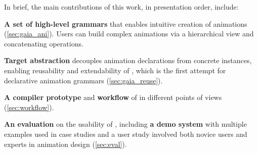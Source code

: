 In brief, the main contributions of this work, in presentation order, include:

\squishlist 
\item \textbf{A set of high-level grammars} that enables intuitive creation of animations (\autoref{sec:gaia_ani}). 
Users can build complex animations via a hierarchical view and concatenating operations. 
\item \textbf{Target abstraction} decouples animation declarations from concrete instances, enabling reusability and extendability of \gaia{}, which is the first attempt for declarative animation grammars (\autoref{sec:gaia_reuse}).
\item \textbf{A compiler prototype} and \textbf{workflow} of \gaia{} in different points of views (\autoref{sec:workflow}).
\item \textbf{An evaluation} on the usability of \gaia{}, including \textbf{a demo system} with multiple examples used in case studies and a user study involved both novice users and experts in animation design (\autoref{sec:eval}).
\squishend